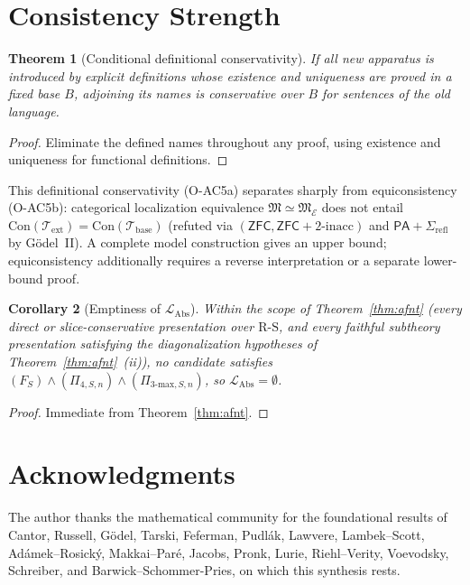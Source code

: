 \documentclass[11pt]{article}
\theoremstyle{plain}
\newtheorem{theorem}{Theorem}[section]
\newtheorem{corollary}[theorem]{Corollary}
\theoremstyle{definition}
\newcommand{\RS}{\mathrm{R\text{-}S}}
\newcommand{\fM}{\mathfrak{M}}
\newcommand{\LAbs}{\mathcal{L}_{\mathrm{Abs}}}
\newcommand{\Con}{\mathrm{Con}}
\newcommand{\PA}{\mathsf{PA}}
\newcommand{\ZFC}{\mathsf{ZFC}}
\begin{document}
\section{Consistency Strength}\label{sec:cons}

\begin{theorem}[Conditional definitional conservativity]\label{thm:consistency}
If all new apparatus is introduced by explicit definitions whose existence and uniqueness are proved in a fixed base $B$, adjoining its names is conservative over $B$ for sentences of the old language.
\end{theorem}
\begin{proof}
Eliminate the defined names throughout any proof, using existence and uniqueness for functional definitions.
\end{proof}
This definitional conservativity \textup{(O-AC5a)} separates sharply from equiconsistency \textup{(O-AC5b)}: categorical localization equivalence $\fM \simeq \fM_{\mathcal{E}}$ does not entail $\Con(\mathcal{T}_{\mathrm{ext}}) = \Con(\mathcal{T}_{\mathrm{base}})$ (refuted via $(\ZFC, \ZFC+2\text{-}\mathrm{inacc})$ and $\PA + \Sigma_{\mathrm{refl}}$ by G\"odel~II). A complete model construction gives an upper bound; equiconsistency additionally requires a reverse interpretation or a separate lower-bound proof.

\begin{corollary}[Emptiness of $\LAbs$]\label{cor:level-6}
Within the scope of Theorem~\ref{thm:afnt} (every direct or slice-conservative presentation over $\RS$, and every faithful subtheory presentation satisfying the diagonalization hypotheses of Theorem~\ref{thm:afnt}~(ii)), no candidate satisfies $(F_S) \wedge (\Pi_{4, S, n}) \wedge (\Pi_{3\text{-max}, S, n})$, so $\LAbs = \emptyset$.
\end{corollary}

\begin{proof}
Immediate from Theorem~\ref{thm:afnt}.
\end{proof}

\section*{Acknowledgments}

The author thanks the mathematical community for the foundational results of Cantor, Russell, G\"odel, Tarski, Feferman, Pudl\'ak, Lawvere, Lambek--Scott, Ad\'amek--Rosick\'y, Makkai--Par\'e, Jacobs, Pronk, Lurie, Riehl--Verity, Voevodsky, Schreiber, and Barwick--Schommer-Pries, on which this synthesis rests.
\end{document}
